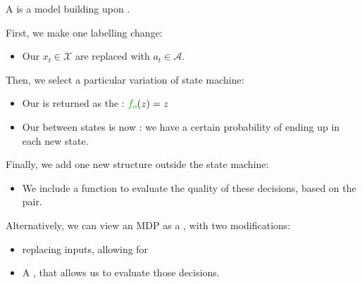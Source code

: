         \begin{definition}
            A  is a model building upon .

            First, we make one labelling change:

            \begin{itemize}
                \item Our  $x_t \in \mathcal{X}$ are replaced with  $a_t \in \mathcal{A}$.
            \end{itemize}

            \phantom{}

            Then, we select a particular variation of state machine:

            \begin{itemize}
                \item Our  is returned as the : $\grn{f_o}(z) = z$
                    
                \item Our  between states is now : we have a certain probability of ending up in each new state.

            \end{itemize}

            \phantom{}

            Finally, we add one new structure outside the state machine:
            
            \begin{itemize}
                \item We include a  function to evaluate the quality of these decisions, based on the  pair.
            \end{itemize}

        \end{definition}

        \phantom{}

        \begin{remark}
            Alternatively, we can view an MDP as a , with two modifications:

            \begin{itemize}
                \item {} replacing inputs, allowing for 
                \item A , that allows us to evaluate those decisions.
            \end{itemize}
        \end{remark}

